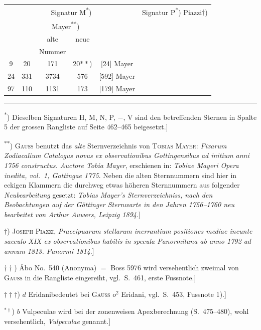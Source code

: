 \documentclass[12pt,a4paper]{article}
\theoremstyle{plain}
\theoremstyle{definition}
\theoremstyle{remark}
\begin{document}
\medskip
\begin{small}
\begin{center}
\begin{tabular}{|c|c|c|c|c||c|c|c|c|}
\hline
\multicolumn{5}{c}{Signatur M\textsuperscript{*})} &
\multicolumn{4}{c}{Signatur P\textsuperscript{*}) \quad Piazzi$\dagger$)} \\
& & \multicolumn{2}{c}{Mayer\textsuperscript{**})} & & & & & \\
& & alte & neue & & & & & \\
& & Nummer & & & & & & \\
\hline
9 & 20 & 171 & 20$**$) & [24] Mayer & & & & \\
24 & 331 & 3734 & 576 & [592] Mayer & & & & \\
97 & 110 & 1131 & 173 & [179] Mayer & & & & \\
\hline
\end{tabular}
\end{center}
\end{small}

\medskip
\noindent\rule{\textwidth}{0.4pt}
\begin{footnotesize}
\textsuperscript{*}) Dieselben Signaturen H, M, N, P, $-$, V sind den betreffenden Sternen
in Spalte 5 der grossen Rangliste auf Seite 462--465 beigesetzt.]

\textsuperscript{**}) \textsc{Gau\ss} benutzt das \textit{alte} Sternverzeichnis von \textsc{Tobias Mayer}:
\textit{\glqq Fixarum Zodiacalium Catalogus novus ex observationibus Gottingensibus ad initium
anni 1756 constructus. Auctore Tobia Mayer\grqq}, erschienen in:
\textit{\glqq Tobiae Mayeri Opera inedita, vol.~1, Gottingae 1775\grqq}. Neben die alten
Sternnummern sind hier in eckigen Klammern die durchweg etwas h\"oheren
Sternnummern aus folgender \textit{Neubearbeitung} gesetzt:
\textit{\glqq Tobias Mayer's Sternverzeichniss, nach den Beobachtungen auf der G\"ottinger
Sternwarte in den Jahren 1756--1760 neu bearbeitet von Arthur Auwers,
Leipzig 1894\grqq}.]

$\dagger$) \textsc{Joseph Piazzi}, \textit{Praecipuarum stellarum inerrantium positiones mediae
ineunte saeculo XIX ex observationibus habitis in specula Panormitana ab
anno 1792 ad annum 1813. Panormi 1814}.]

$\dagger\dagger$) \AA bo No.~540 (Anonyma) $=$ Boss 5976 wird versehentlich zweimal
von \textsc{Gau\ss} in die Rangliste eingereiht, vgl.~S.~461, erste Fussnote.]

$\dagger\dagger\dagger$) \glqq $d$ Eridani\grqq bedeutet bei \textsc{Gau\ss} $o^{2}$ Eridani, vgl.~S.~453, Fussnote 1).]

$^{*\dagger}$) $b$ Vulpeculae wird bei der zonenweisen Apexberechnung (S.~475--480),
wohl versehentlich, \textit{ Vulpeculae\grqq} genannt.]
\end{footnotesize}
\end{document}
